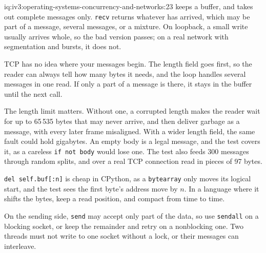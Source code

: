 \begin{solution}{iq:iv3:operating-systems-concurrency-and-networks:23}
 keeps a buffer, and takes out complete messages only. \texttt{recv} returns whatever has arrived, which may be part of a message, several messages, or a mixture. On loopback, a small write usually arrives whole, so the bad version passes; on a real network with segmentation and bursts, it does not.
\enlargethispage{-3\baselineskip}%
\label{lst:iv3:os:framing}

TCP has no idea where your messages begin. The length field goes first, so the reader can always tell how many bytes it needs, and the loop handles several messages in one read. If only a part of a message is there, it stays in the buffer until the next call.

The length limit matters. Without one, a corrupted length makes the reader wait for up to 65\,535 bytes that may never arrive, and then deliver garbage as a message, with every later frame misaligned. With a wider length field, the same fault could hold gigabytes. An empty body is a legal message, and the test covers it, as a careless \texttt{if not body} would lose one. The test also feeds 300 messages through random splits, and over a real TCP connection read in pieces of 97 bytes.

\texttt{del self.buf[:n]} is cheap in CPython, as a \texttt{bytearray} only moves its logical start, and the test sees the first byte's address move by $n$. In a language where it shifts the bytes, keep a read position, and compact from time to time.

On the sending side, \texttt{send} may accept only part of the data, so use \texttt{sendall} on a blocking socket, or keep the remainder and retry on a nonblocking one. Two threads must not write to one socket without a lock, or their messages can interleave.

\end{solution}

